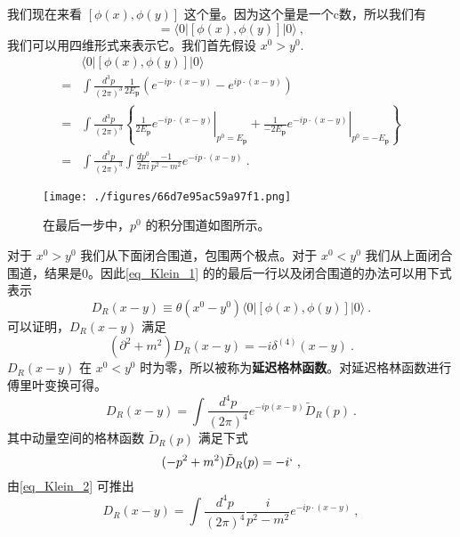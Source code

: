 我们现在来看 $[\phi(x),\phi(y)]$ 这个量。因为这个量是一个c数，所以我们有
\begin{equation}
[\phi(x),\phi(y)] = \langle 0 | [\phi(x),\phi(y)] | 0 \rangle~,
\end{equation}
我们可以用四维形式来表示它。我们首先假设 $x^0>y^0$.
\begin{equation}\label{eq_Klein_1}
\begin{aligned}
& \langle 0|[\phi(x), \phi(y)]| 0\rangle\\
=&\int \frac{d^{3} p}{(2 \pi)^{3}} \frac{1}{2 E_{\mathbf{p}}}\left(e^{-i p \cdot(x-y)}-e^{i p \cdot(x-y)}\right) \\ 
=& \int \frac{d^{3} p}{(2 \pi)^{3}}\left\{\left.\frac{1}{2 E_{\mathbf{p}}} e^{-i p \cdot(x-y)}\right|_{p^{0}=E_{\mathbf{p}}}+\left.\frac{1}{-2 E_{\mathbf{p}}} e^{-i p \cdot(x-y)}\right|_{p^{0}=-E_{\mathbf{p}}}\right\} \\
=& \int \frac{d^{3} p}{(2 \pi)^{3}} \int \frac{d p^{0}}{2 \pi i} \frac{-1}{p^{2}-m^{2}} e^{-i p \cdot(x-y)} ~.
\end{aligned}
\end{equation}
\begin{figure}[ht]
\centering
\texttt{[image: ./figures/66d7e95ac59a97f1.png]}
\caption{在最后一步中，$p^0$ 的积分围道如图所示。} \label{fig_Klein_1}
\end{figure}
对于 $x^0>y^0$ 我们从下面闭合围道，包围两个极点。对于 $x^0<y^0$ 我们从上面闭合围道，结果是0。因此\autoref{eq_Klein_1} 的的最后一行以及闭合围道的办法可以用下式表示
\begin{equation}
D_R(x-y)\equiv \theta(x^0-y^0)\langle 0 | [\phi(x),\phi(y)]|0 \rangle~.
\end{equation}
可以证明，$D_R(x-y)$ 满足
\begin{equation}
(\partial^2+m^2)D_R(x-y) = -i \delta^{(4)}(x-y)~.
\end{equation}
$D_R(x-y)$ 在 $x^0<y^0$ 时为零，所以被称为\textbf{延迟格林函数}。对延迟格林函数进行傅里叶变换可得。
\begin{equation}
D_R(x-y) = \int \frac{d^4p}{(2\pi)^4} e^{-ip(x-y)} \tilde D_R (p)~.
\end{equation}
其中动量空间的格林函数 $\tilde D_R(p)$ 满足下式
\begin{equation}\label{eq_Klein_2}
(-p^2+m^2) \tilde D_R(p) = -i`~,
\end{equation}
由\autoref{eq_Klein_2} 可推出
\begin{equation}
D_R (x-y) = \int \frac{d^4p}{(2\pi)^4} \frac{i}{p^2-m^2} e^{-ip\cdot(x-y)}~,
\end{equation}
